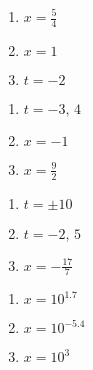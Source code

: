 \documentclass{ximera}
\begin{document}
	\author{Stitz-Zeager}



\label{ExercisesforLogarithmicEquationsandInequalities}


\begin{enumerate}

\item $x = \frac{5}{4}$
\item $x = 1$
\item $t=-2$

\setcounter{HW}{\value{enumi}}
\end{enumerate}

\begin{enumerate}
\setcounter{enumi}{\value{HW}}

\item $t=-3,\, 4$
\item $x=-1$
\item $x=\frac{9}{2}$

\setcounter{HW}{\value{enumi}}
\end{enumerate}

\begin{enumerate}
\setcounter{enumi}{\value{HW}}

\item $t=\pm 10$
\item $t=-2,\, 5$
\item $x = -\frac{17}{7}$

\setcounter{HW}{\value{enumi}}
\end{enumerate}

\begin{enumerate}
\setcounter{enumi}{\value{HW}}

\item $x = 10^{1.7}$
\item $x = 10^{-5.4}$
\item $x = 10^{3}$

\setcounter{HW}{\value{enumi}}
\end{enumerate}
\end{document}
